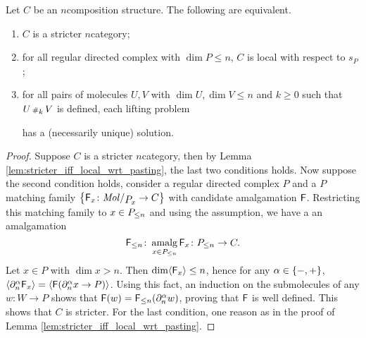 \begin{lem} \label{lem:stricter_n_iff_local_with_dim_le_n}
    Let \( C \) be an \( n \)\nbd composition structure.
    The following are equivalent.
    \begin{enumerate}
        \item \( C \) is a stricter \( n \)\nbd category;
        \item for all regular directed complex with \( \dim P \le n \), \( C \) is local with respect to \( s_P \);
        \item for all pairs of molecules \( U, V \) with \( \dim U, \dim V \le n \) and \( k \geq 0 \) such that \( U \cp{k} V \) is defined, each lifting problem
            \begin{center}
            \end{center}
            has a (necessarily unique) solution.
    \end{enumerate}
\end{lem}
\begin{proof}
    Suppose \( C \) is a stricter \( n \)\nbd category, then by Lemma \ref{lem:stricter_iff_local_wrt_pasting}, the last two conditions holds.
    Now suppose the second condition holds, consider a regular directed complex \( P \) and a \( P \)\nbd matching family \( \set{\F_x \colon \molecin{\imel{P}{x}} \to C} \) with candidate amalgamation \( \F \).
    Restricting this matching family to \( x \in \gr{\le n}{P} \) and using the assumption, we have a an amalgamation 
    \begin{equation*}
        \gr{\le n}{\F} \colon \amalg_{x \in \gr{\le n}{P}} \F_x \colon \gr{\le n}{P} \to C.
    \end{equation*}
    Let \( x \in P \) with \( \dim x > n \).
    Then \( \dim \pcell{\F_x} \le n \), hence for any \( \a \in \set{-, +} \), \( \pcell{\bd{n}{\a} \F_x} = \pcell{\F(\bd{n}{\a} x \to P)} \).
    Using this fact, an induction on the submolecules of any \( w \colon W \to P \) shows that \( \F(w) = \gr{\le n}{\F}(\bd{n}{\a} w) \), proving that \( \F \) is well defined.
    This shows that \( C \) is stricter.
    For the last condition, one reason as in the proof of Lemma \ref{lem:stricter_iff_local_wrt_pasting}.
\end{proof}

